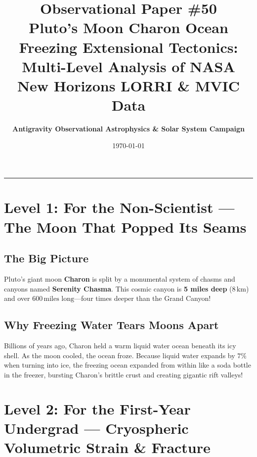 \documentclass[11pt,a4paper]{article}
\title{\Huge \textbf{Observational Paper \#50}\\ \Large Pluto's Moon Charon Ocean Freezing Extensional Tectonics: Multi-Level Analysis of NASA New Horizons LORRI \& MVIC Data}
\author{\textbf{Antigravity Observational Astrophysics \& Solar System Campaign}}
\date{\today}
\begin{document}
\maketitle

\vspace{-1em}
\begin{center}
\rule{\textwidth}{1.5pt}
\end{center}

\section*{Level 1: For the Non-Scientist — The Moon That Popped Its Seams}

\subsection*{The Big Picture}
Pluto's giant moon \textbf{Charon} is split by a monumental system of chasms and canyons named \textbf{Serenity Chasma}. This cosmic canyon is \textbf{5 miles deep} ($8\,\text{km}$) and over $600\,\text{miles long}$—four times deeper than the Grand Canyon!

\subsection*{Why Freezing Water Tears Moons Apart}
Billions of years ago, Charon held a warm liquid water ocean beneath its icy shell. As the moon cooled, the ocean froze. Because liquid water expands by $7\%$ when turning into ice, the freezing ocean expanded from within like a soda bottle in the freezer, bursting Charon's brittle crust and creating gigantic rift valleys!

\newpage

\section*{Level 2: For the First-Year Undergrad — Cryospheric Volumetric Strain \& Fracture}
\end{document}
